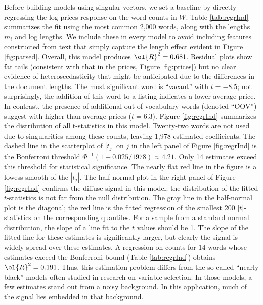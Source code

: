 \documentclass[10pt]{article}
\begin{document}
 Before building models using singular vectors, we set a baseline by directly
 regressing the log prices response on the word counts in $W$.  Table
 \ref{tab:regrInd} summarizes the fit using the most common 2,000 words, along
 with the lengths $m_i$ and log lengths.  We include these in every model to
 avoid including features constructed from text that simply capture the length
 effect evident in Figure \ref{fig:parsed}.  Overall, this model produces
 $\ol{R}^2 = 0.681$.  Residual plots show fat tails (consistent with that in the
 prices, Figure \ref{fig:prices}) but no clear evidence of heteroscedasticity
 that might be anticipated due to the differences in the document lengths.  The
 most significant word is ``vacant'' with $t=-8.5$; not surprisingly, the
 addition of this word to a listing indicates a lower average price.  In
 contrast, the presence of additional out-of-vocabulary words (denoted ``OOV'')
 suggest with higher than average prices ($t=6.3$). Figure \ref{fig:regrInd}
 summarizes the distribution of all t-statistics in this model.  Twenty-two
 words are not used due to singularities among these counts, leaving 1,978
 estimated coefficients.  The dashed line in the scatterplot of $|t_j|$ on $j$
 in the left panel of Figure \ref{fig:regrInd} is the Bonferroni threshold
 $\Phi^{-1}(1-0.025/1978) \approx 4.21$.  Only 14 estimates exceed this
 threshold for statistical significance.  The nearly flat red line in the figure
 is a lowess smooth of the $|t_j|$.  The half-normal plot in the right panel of
 Figure \ref{fig:regrInd} confirms the diffuse signal in this model: the
 distribution of the fitted $t$-statistics is not far from the null
 distribution.  The gray line in the half-normal plot is the diagonal; the red
 line is the fitted regression of the smallest 200 $|t|$-statistics on the
 corresponding quantiles.  For a sample from a standard normal distribution, the
 slope of a line fit to the $t$ values should be 1.  The slope of the fitted
 line for these estimates is significantly larger, but clearly the signal is
 widely spread over these estimates.  A regression on counts for 14 words whose
 estimates exceed the Bonferroni bound (Table \ref{tab:regrInd}) obtains
 $\ol{R}^2 = 0.191$.  Thus, this estimation problem differs from the so-called
 ``nearly black'' models often studied in research on variable selection.  In
 those models, a few estimates stand out from a noisy background. In this
 application, much of the signal lies embedded in that background.
\end{document}

